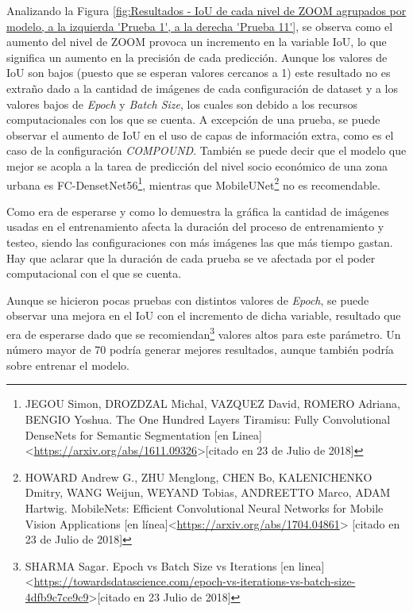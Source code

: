 Analizando la Figura \ref{fig:Resultados - IoU de cada nivel de ZOOM agrupados por modelo, a la izquierda 'Prueba 1', a la derecha 'Prueba 11'}, se observa como el aumento del nivel de ZOOM provoca un incremento en la variable IoU, lo que significa un aumento en la precisión de cada predicción. Aunque los valores de IoU son bajos (puesto que se esperan valores cercanos a 1) este resultado no es extraño dado a la cantidad de imágenes de cada configuración de dataset y a los valores bajos de \textit{Epoch} y \textit{Batch Size}, los cuales son debido a los recursos computacionales con los que se cuenta. A excepción de una prueba, se puede observar el aumento de IoU en el uso de capas de información extra, como es el caso de la configuración \textit{COMPOUND}. También se puede decir que el modelo que mejor se acopla a la tarea de predicción del nivel socio económico de una zona urbana es FC-DensetNet56\footnote[23]{JEGOU Simon, DROZDZAL Michal, VAZQUEZ David, ROMERO Adriana, BENGIO Yoshua. The One Hundred Layers Tiramisu: Fully Convolutional DenseNets for Semantic Segmentation [en Linea]<\url{https://arxiv.org/abs/1611.09326}>[citado en 23 de Julio de 2018]}, mientras que MobileUNet\footnote[24]{HOWARD Andrew G., ZHU Menglong, CHEN Bo, KALENICHENKO Dmitry, WANG Weijun, WEYAND Tobias, ANDREETTO Marco, ADAM Hartwig. MobileNets: Efficient Convolutional Neural Networks for Mobile Vision Applications [en línea]<\url{https://arxiv.org/abs/1704.04861}> [citado en 23 de Julio de 2018]} no es recomendable. 


Como era de esperarse y como lo demuestra la gráfica la cantidad de imágenes usadas en el entrenamiento afecta la duración del proceso de entrenamiento y testeo, siendo las configuraciones con más imágenes las que más tiempo gastan. Hay que aclarar que la duración de cada prueba se ve afectada por el poder computacional con el que se cuenta.




Aunque se hicieron pocas pruebas con distintos valores de \textit{Epoch}, se puede observar una mejora en el IoU con el incremento de dicha variable, resultado que era de esperarse dado que se recomiendan\footnote[25]{SHARMA Sagar. Epoch vs Batch Size vs Iterations [en linea]<\url{https://towardsdatascience.com/epoch-vs-iterations-vs-batch-size-4dfb9c7ce9c9}>[citado en 23 Julio de 2018]} valores altos para este parámetro. Un número mayor de 70 podría generar mejores resultados, aunque también podría sobre entrenar el modelo. 

